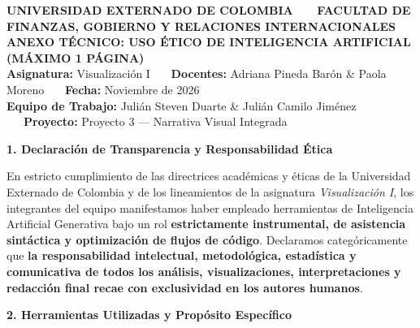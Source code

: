 \documentclass[10pt,letterpaper]{article}
\begin{document}
\begin{tcolorbox}[colback=navy,colframe=navy,arc=0pt,top=6pt,bottom=6pt,left=8pt,right=8pt]
  \color{white}
  {\fontsize{8.5pt}{10pt}\selectfont \textbf{UNIVERSIDAD EXTERNADO DE COLOMBIA \ \textbullet \ \ FACULTAD DE FINANZAS, GOBIERNO Y RELACIONES INTERNACIONALES}}\\[2pt]
  {\fontsize{13pt}{15pt}\selectfont \textbf{ANEXO TÉCNICO: USO ÉTICO DE INTELIGENCIA ARTIFICIAL (MÁXIMO 1 PÁGINA)}}\\[2pt]
  {\fontsize{8.5pt}{10pt}\selectfont \textbf{Asignatura:} Visualización I \ \textbullet \ \ \textbf{Docentes:} Adriana Pineda Barón \& Paola Moreno \ \textbullet \ \ \textbf{Fecha:} Noviembre de 2026}\\[1pt]
  {\fontsize{8.5pt}{10pt}\selectfont \textbf{Equipo de Trabajo:} Julián Steven Duarte \& Julián Camilo Jiménez \ \textbullet \ \ \textbf{Proyecto:} Proyecto 3 --- Narrativa Visual Integrada}
\end{tcolorbox}

\vspace{2pt}

{\color{navy}\fontsize{10pt}{12pt}\selectfont \textbf{1. Declaración de Transparencia y Responsabilidad Ética}}
\vspace{1pt}

{\fontsize{8.5pt}{11pt}\selectfont
En estricto cumplimiento de las directrices académicas y éticas de la Universidad Externado de Colombia y de los lineamientos de la asignatura \textit{Visualización I}, los integrantes del equipo manifestamos haber empleado herramientas de Inteligencia Artificial Generativa bajo un rol \textbf{estrictamente instrumental, de asistencia sintáctica y optimización de flujos de código}. Declaramos categóricamente que \textbf{la responsabilidad intelectual, metodológica, estadística y comunicativa de todos los análisis, visualizaciones, interpretaciones y redacción final recae con exclusividad en los autores humanos}.}

\vspace{2pt}

{\color{navy}\fontsize{10pt}{12pt}\selectfont \textbf{2. Herramientas Utilizadas y Propósito Específico}}
\vspace{1pt}
\end{document}
